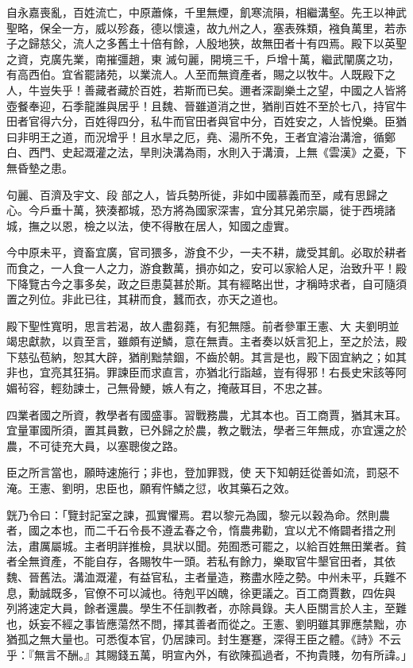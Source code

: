 \begin{pinyinscope}
 自永嘉喪亂，百姓流亡，中原蕭條，千里無煙，飢寒流隕，相繼溝壑。先王以神武聖略，保全一方，威以殄姦，德以懷遠，故九州之人，塞表殊類，襁負萬里，若赤子之歸慈父，流人之多舊土十倍有餘，人殷地狹，故無田者十有四焉。殿下以英聖之資，克廣先業，南摧彊趙，東
 滅句麗，開境三千，戶增十萬，繼武闡廣之功，有高西伯。宜省罷諸苑，以業流人。人至而無資產者，賜之以牧牛。人既殿下之人，牛豈失乎！善藏者藏於百姓，若斯而已矣。邇者深副樂土之望，中國之人皆將壺餐奉迎，石季龍誰與居乎！且魏、晉雖道消之世，猶削百姓不至於七八，持官牛田者官得六分，百姓得四分，私牛而官田者與官中分，百姓安之，人皆悅樂。臣猶曰非明王之道，而況增乎！且水旱之厄，堯、湯所不免，王者宜濬治溝澮，循鄭白、西門、史起溉灌之法，旱則決溝為雨，水則入于溝瀆，上無《雲漢》之憂，下無昏墊之患。



 句麗、百濟及宇文、段
 部之人，皆兵勢所徙，非如中國慕義而至，咸有思歸之心。今戶垂十萬，狹湊都城，恐方將為國家深害，宜分其兄弟宗屬，徙于西境諸城，撫之以恩，檢之以法，使不得散在居人，知國之虛實。



 今中原未平，資畜宜廣，官司猥多，游食不少，一夫不耕，歲受其飢。必取於耕者而食之，一人食一人之力，游食數萬，損亦如之，安可以家給人足，治致升平！殿下降覽古今之事多矣，政之巨患莫甚於斯。其有經略出世，才稱時求者，自可隨須置之列位。非此已往，其耕而食，蠶而衣，亦天之道也。



 殿下聖性寬明，思言若渴，故人盡芻蕘，有犯無隱。前者參軍王憲、大
 夫劉明並竭忠獻款，以貢至言，雖頗有逆鱗，意在無責。主者奏以妖言犯上，至之於法，殿下慈弘苞納，恕其大辟，猶削黜禁錮，不齒於朝。其言是也，殿下固宜納之；如其非也，宜亮其狂狷。罪諫臣而求直言，亦猶北行詣越，豈有得邪！右長史宋該等阿媚茍容，輕劾諫士，己無骨鯁，嫉人有之，掩蔽耳目，不忠之甚。



 四業者國之所資，教學者有國盛事。習戰務農，尤其本也。百工商賈，猶其末耳。宜量軍國所須，置其員數，已外歸之於農，教之戰法，學者三年無成，亦宜還之於農，不可徒充大員，以塞聰俊之路。



 臣之所言當也，願時速施行；非也，登加罪戮，使
 天下知朝廷從善如流，罰惡不淹。王憲、劉明，忠臣也，願宥忤鱗之愆，收其藥石之效。



 皝乃令曰：「覽封記室之諫，孤實懼焉。君以黎元為國，黎元以穀為命。然則農者，國之本也，而二千石令長不遵孟春之令，惰農弗勸，宜以尤不脩闢者措之刑法，肅厲屬城。主者明詳推檢，具狀以聞。苑囿悉可罷之，以給百姓無田業者。貧者全無資產，不能自存，各賜牧牛一頭。若私有餘力，樂取官牛墾官田者，其依魏、晉舊法。溝洫溉灌，有益官私，主者量造，務盡水陸之勢。中州未平，兵難不息，勳誠既多，官僚不可以減也。待剋平凶醜，徐更議之。百工商賈數，四佐與
 列將速定大員，餘者還農。學生不任訓教者，亦除員錄。夫人臣關言於人主，至難也，妖妄不經之事皆應蕩然不問，擇其善者而從之。王憲、劉明雖其罪應禁黜，亦猶孤之無大量也。可悉復本官，仍居諫司。封生蹇蹇，深得王臣之體。《詩》不云乎：『無言不酬。』其賜錢五萬，明宣內外，有欲陳孤過者，不拘貴賤，勿有所諱。」




\end{pinyinscope}
